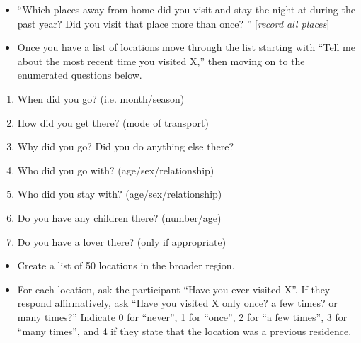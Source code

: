 \documentclass[idxtotoc,hyperref,openany]{labbook} %
\begin{document}


\begin{itemize}

\item ``Which places away from home did you visit and stay the night at during the past year? Did you visit that place more than once? '' [\emph{record all places}]

\item Once you have a list of locations move through the list starting with ``Tell me about the most recent time you visited X,'' then moving on to the enumerated questions below.

\end{itemize}

\begin{enumerate}
\item When did you go? (i.e. month/season)

\item How did you get there? (mode of transport)

\item Why did you go? Did you do anything else there?

\item Who did you go with? (age/sex/relationship)

\item Who did you stay with? (age/sex/relationship)

\item Do you have any children there? (number/age)

\item Do you have a lover there? (only if appropriate)

\end{enumerate}



\begin{itemize}

\item Create a list of 50 locations in the broader region.

\item For each location, ask the participant ``Have you ever visited X''.  If they respond affirmatively, ask ``Have you visited X only once? a few times? or many times?''  Indicate 0 for ``never'', 1 for ``once'', 2 for ``a few times'', 3 for ``many times'', and 4 if they state that the location was a previous residence.

\end{itemize}
\end{document}
